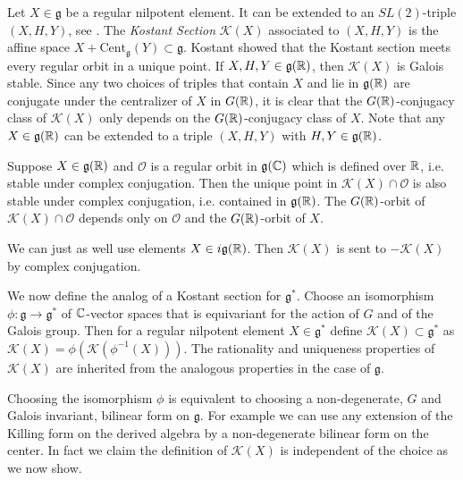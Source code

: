 \documentclass{article}
\theoremstyle{definition}
\numberwithin{equation}{section}
\renewcommand{\-}{\hyp{}}
\newcommand{\g}{\mathfrak g}
\renewcommand{\O}{\mathcal O}
\newcommand{\K}{\mathcal K}
\newcommand{\Cent}{\mathrm{Cent}}
\begin{document}
Let $X\in\g$ be a regular nilpotent element. It can be extended to an $SL(2)$-triple $(X,H,Y)$, see \cite[Chapter 3]{CM}.  The \emph{Kostant Section} $\K(X)$ associated to 
$(X,H,Y)$ is the affine space $X+\Cent_\g(Y) \subset \g$.
Kostant showed \cite{Kos63} that the Kostant section meets every regular orbit in a unique point. If $X,H,Y \in \g(\R)$, then $\K(X)$ is Galois stable. Since any two choices of triples that contain $X$ and lie in $\g(\R)$ are conjugate under the centralizer of $X$ in $G(\mathbb{R})$, it is clear that the $G(\mathbb{R})$-conjugacy class of $\K(X)$ only depends on the $G(\mathbb{R})$-conjugacy class of $X$. Note that any $X \in \g(\R)$ can be extended to a triple $(X,H,Y)$ with $H,Y \in \g(\R)$.

Suppose $X\in \g(\R)$ and $\O$ is a regular orbit in $\g(\C)$ which is defined over $\mathbb{R}$, i.e. stable under complex conjugation. Then the unique point in $\K(X)\cap \O$ is also stable under complex conjugation, i.e. contained in $\g(\R)$. The $G(\mathbb{R})$-orbit of $\K(X)\cap \O$ depends only on $\O$ and the $G(\mathbb{R})$-orbit of $X$.

We can just as well use elements $X \in i\g(\R)$. Then $\K(X)$ is sent to $-\K(X)$ by complex conjugation.

We now define the analog of a Kostant section for $\g^*$. Choose an isomorphism
$\phi : \g \to \g^*$ of $\mathbb{C}$-vector spaces that is 
equivariant for the
action of $G$ and of the Galois group.
Then for a regular nilpotent element $X\in \g^*$ define
$\K(X)\subset \g^*$ as $\K(X) = \phi(\K(\phi^{-1}(X)))$. The
rationality and uniqueness properties of $\K(X)$ are inherited from
the analogous properties in the case of $\g$. 

Choosing the isomorphism $\phi$ is equivalent to choosing a non-degenerate, $G$
and Galois invariant, bilinear form on $\g$. For example we can use any
extension of the Killing form on the derived algebra by a non-degenerate bilinear form on the
center. In fact we claim the definition of $\K(X)$ is independent of
the choice as we now show.
\end{document}
